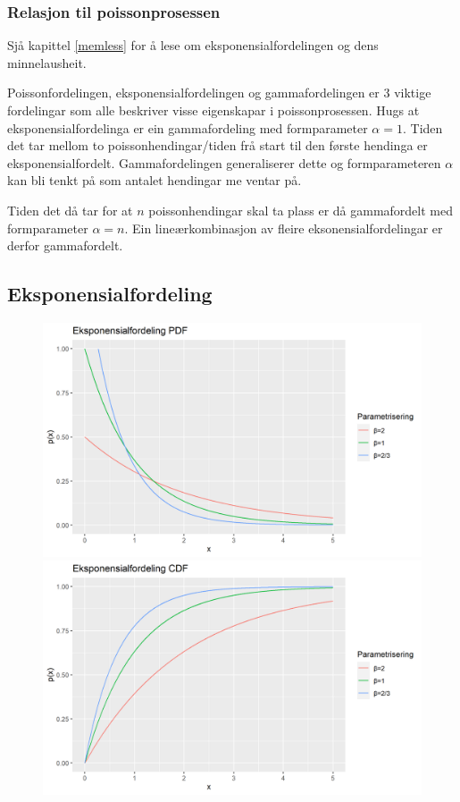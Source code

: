 \subsubsection{Relasjon til poissonprosessen}
Sjå kapittel \ref{memless} for å lese om eksponensialfordelingen og dens minnelausheit.

Poissonfordelingen, eksponensialfordelingen og gammafordelingen er 3 viktige fordelingar som alle beskriver visse eigenskapar i poissonprosessen. Hugs at eksponensialfordelinga er ein gammafordeling med formparameter $\alpha = 1$. Tiden det tar mellom to poissonhendingar/tiden frå start til den første hendinga er eksponensialfordelt. Gammafordelingen generaliserer dette og formparameteren $\alpha$ kan bli tenkt på som antalet hendingar me ventar på.

Tiden det då tar for at $n$ poissonhendingar skal ta plass er då gammafordelt med formparameter $\alpha = n$. Ein lineærkombinasjon av fleire eksonensialfordelingar er derfor gammafordelt.

\subsection{Eksponensialfordeling}\label{eksp}
\begin{figure}[H]
  \centering
  \begin{minipage}[b]{0.49\textwidth}
\includegraphics[width=\textwidth]{bilete/eksppdf.png}
  \end{minipage}
  \hfill
  \begin{minipage}[b]{0.49\textwidth}
    \includegraphics[width=\textwidth]{bilete/ekspcdf.png}
  \end{minipage}
\end{figure}

